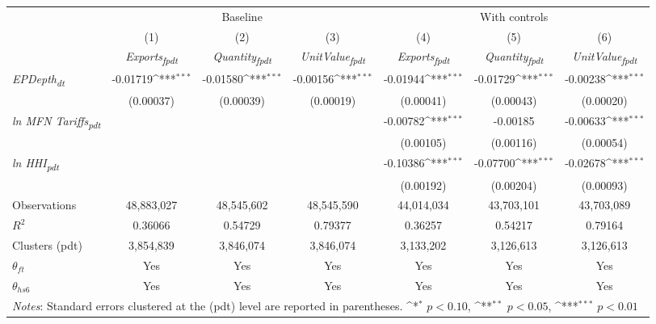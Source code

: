 {
\def\sym#1{\ifmmode^{#1}\else\(^{#1}\)\fi}
\begin{tabular}{l*{6}{c}}
\toprule
&\multicolumn{3}{c}{Baseline}&\multicolumn{3}{c}{With controls}\\\cmidrule(lr){2-4}\cmidrule(lr){5-7}
&(1)&(2)&(3)&(4)&(5)&(6)\\
&\textit{Exports\textsubscript{fpdt}}&\textit{Quantity\textsubscript{fpdt}}&\textit{UnitValue\textsubscript{fpdt}}&\textit{Exports\textsubscript{fpdt}}&\textit{Quantity\textsubscript{fpdt}}&\textit{UnitValue\textsubscript{fpdt}}\\
\midrule
\textit{EPDepth\textsubscript{dt}} & -0.01719\sym{***} & -0.01580\sym{***} & -0.00156\sym{***} & -0.01944\sym{***} & -0.01729\sym{***} & -0.00238\sym{***}\\
 & (0.00037) & (0.00039) & (0.00019) & (0.00041) & (0.00043) & (0.00020)\\
\addlinespace
\textit{ln MFN Tariffs\textsubscript{pdt}} &  &  &  & -0.00782\sym{***} & -0.00185 & -0.00633\sym{***}\\
 &  &  &  & (0.00105) & (0.00116) & (0.00054)\\
\addlinespace
\textit{ln HHI\textsubscript{pdt}} &  &  &  & -0.10386\sym{***} & -0.07700\sym{***} & -0.02678\sym{***}\\
 &  &  &  & (0.00192) & (0.00204) & (0.00093)\\
\midrule
Observations & 48,883,027 & 48,545,602 & 48,545,590 & 44,014,034 & 43,703,101 & 43,703,089\\
$R^{2}$ & 0.36066 & 0.54729 & 0.79377 & 0.36257 & 0.54217 & 0.79164\\
Clusters (pdt) & 3,854,839 & 3,846,074 & 3,846,074 & 3,133,202 & 3,126,613 & 3,126,613\\
$\theta_{ft}$ & Yes & Yes & Yes & Yes & Yes & Yes\\
$\theta_{hs6}$ & Yes & Yes & Yes & Yes & Yes & Yes\\
\bottomrule
\multicolumn{7}{l}{\footnotesize \textit{Notes}: Standard errors clustered at the (pdt) level are reported in parentheses. \sym{*} \(p<0.10\), \sym{**} \(p<0.05\), \sym{***} \(p<0.01\)}\\
\end{tabular}
}
